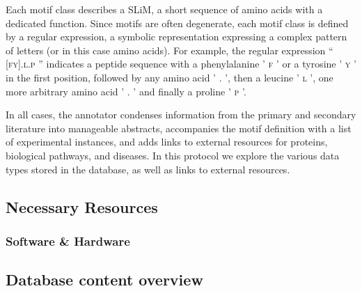 \documentclass[12pt]{article}
\newcounter{proto}
\newcommand\motif[1]{%
    \textsc{\lowercase{#1}}%
}
\begin{document}
Each motif class describes a SLiM, a short sequence of amino acids with a
dedicated function. Since motifs are often degenerate, each motif class is
defined by a regular expression, a symbolic representation expressing a complex
pattern of letters (or in this case amino acids). For example, the regular
expression ``\motif{[FY].L.P}'' indicates a peptide sequence with a
phenylalanine '\motif{F}' or a tyrosine '\motif{Y}' in the first position,
followed by any amino acid '\motif{.}', then a leucine '\motif{L}', one more
arbitrary amino acid '\motif{.}' and finally a proline '\motif{P}'.

In all cases, the annotator condenses information from the primary and secondary
literature into manageable abstracts, accompanies the motif definition with a
list of experimental instances, and adds links to external resources for
proteins, biological pathways, and diseases. In this protocol we explore the
various data types stored in the database, as well as links to external
resources.

%
%
\subsection*{Necessary Resources}
\subsubsection*{Software \& Hardware}



%
%
\subsection*{Database content overview}%
\label{subsec:explore_content_database}%
\end{document}
